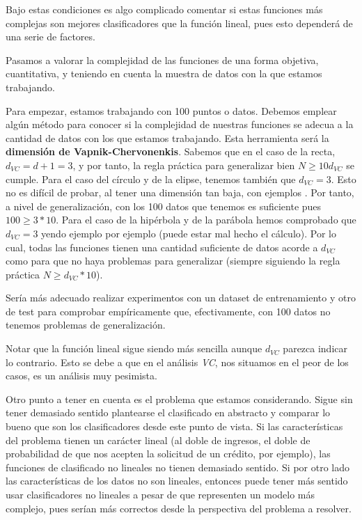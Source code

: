 \documentclass[11pt]{article}
\begin{document}
Bajo estas condiciones es algo complicado comentar si estas funciones más complejas son mejores clasificadores que la función lineal, pues esto dependerá de una serie de factores.

Pasamos a valorar la complejidad de las funciones de una forma objetiva, cuantitativa, y teniendo en cuenta la muestra de datos con la que estamos trabajando.

Para empezar, estamos trabajando con 100 puntos o datos. Debemos emplear algún método para conocer si la complejidad de nuestras funciones se adecua a la cantidad de datos con los que estamos trabajando. Esta herramienta será la \textbf{dimensión de Vapnik-Chervonenkis}. Sabemos que en el caso de la recta, $d_{VC} = d + 1 = 3$, y por tanto, la regla práctica para generalizar bien $N \geq 10 d_{VC}$ se cumple. Para el caso del círculo y de la elipse, tenemos también que $d_{VC} = 3$. Esto no es difícil de probar, al tener una dimensión tan baja, con ejemplos \footnotemark. Por tanto, a nivel de generalización, con los 100 datos que tenemos es suficiente pues $100 \geq 3 * 10$. Para el caso de la hipérbola y de la parábola hemos comprobado que $d_{VC} = 3$ yendo ejemplo por ejemplo (puede estar mal hecho el cálculo). Por lo cual, todas las funciones tienen una cantidad suficiente de datos acorde a $d_{VC}$ como para que no haya problemas para generalizar (siempre siguiendo la regla práctica $N \geq d_{VC} * 10$).

Sería más adecuado realizar experimentos con un dataset de entrenamiento y otro de test para comprobar empíricamente que, efectivamente, con 100 datos no tenemos problemas de generalización.

Notar que la función lineal sigue siendo más sencilla aunque $d_{VC}$ parezca indicar lo contrario. Esto se debe a que en el análisis \emph{VC}, nos situamos en el peor de los casos, es un análisis muy pesimista.

Otro punto a tener en cuenta es el problema que estamos considerando. Sigue sin tener demasiado sentido plantearse el clasificado en abstracto y comparar lo bueno que son los clasificadores desde este punto de vista. Si las características del problema tienen un carácter lineal (al doble de ingresos, el doble de probabilidad de que nos acepten la solicitud de un crédito, por ejemplo), las funciones de clasificado no lineales no tienen demasiado sentido. Si por otro lado las características de los datos no son lineales, entonces puede tener más sentido usar clasificadores no lineales a pesar de que representen un modelo más complejo, pues serían más correctos desde la perspectiva del problema a resolver.
\end{document}
